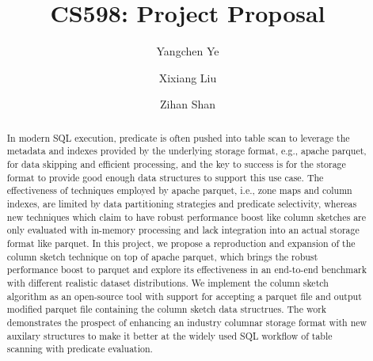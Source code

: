 \documentclass[sigconf, nonacm]{acmart}
\begin{document}
\title{CS598: Project Proposal}

\author{Yangchen Ye}

\author{Xixiang Liu}

\author{Zihan Shan}

\begin{abstract}

In modern SQL execution, predicate is often pushed into table scan to leverage the metadata and indexes provided by the underlying storage format, e.g., apache parquet, for data skipping and efficient processing, and the key to success is for the storage format to provide good enough data structures to support this use case.
The effectiveness of techniques employed by apache parquet, i.e., zone maps and column indexes, are limited by data partitioning strategies and predicate selectivity, whereas new techniques which claim to have robust performance boost like column sketches are only evaluated with in-memory processing and lack integration into an actual storage format like parquet.
In this project, we propose a reproduction and expansion of the column sketch technique on top of apache parquet, which brings the robust performance boost to parquet and explore its effectiveness in an end-to-end benchmark with different realistic dataset distributions.
We implement the column sketch algorithm as an open-source tool with support for accepting a parquet file and output modified parquet file containing the column sketch data structrues.
The work demonstrates the prospect of enhancing an industry columnar storage format with new auxilary structures to make it better at the widely used SQL workflow of table scanning with predicate evaluation.

\end{abstract}

\maketitle




% 





\end{document}
